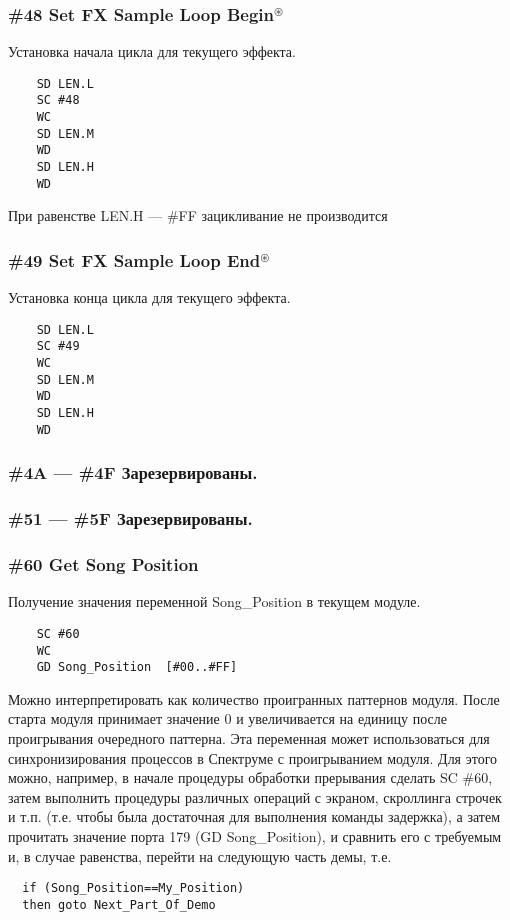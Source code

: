 \documentclass[a4paper,11pt]{article}
\DeclareRobustCommand{\Cyrax}{\texorpdfstring{\(^\circledast\)}{\circledast}}
\begin{document}
\subsubsection{\#48 Set FX Sample Loop Begin\Cyrax}
Установка начала цикла для текущего эффекта.
\begin{verbatim}
    SD LEN.L
    SC #48
    WC
    SD LEN.M
    WD
    SD LEN.H
    WD
\end{verbatim}

При равенстве LEN.H --- \#FF зацикливание не производится

\subsubsection{\#49 Set FX Sample Loop End\Cyrax\label{cmd:49}}
Установка конца цикла для текущего эффекта.
\begin{verbatim}
    SD LEN.L
    SC #49
    WC
    SD LEN.M
    WD
    SD LEN.H
    WD
\end{verbatim}

\subsubsection{\#4A --- \#4F Зарезервированы.}

\subsubsection{\#51 --- \#5F Зарезервированы.}

\subsubsection{\#60 Get Song Position}
Получение значения переменной Song\_Position в текущем модуле.
\begin{verbatim}
    SC #60
    WC
    GD Song_Position  [#00..#FF]
\end{verbatim}

Можно интерпретировать как количество проигранных паттернов модуля. После старта модуля принимает значение 0 и увеличивается на единицу после проигрывания очередного паттерна. Эта переменная может использоваться для синхронизирования процессов в Спектруме с проигрыванием модуля. Для этого можно, например, в начале процедуры обработки прерывания сделать SC  \#60, затем выполнить процедуры различных операций с экраном, скроллинга строчек и т.п. (т.е. чтобы была достаточная для выполнения команды задержка), а затем прочитать значение порта 179 (GD Song\_Position), и сравнить его с требуемым и, в случае равенства, перейти на следующую часть демы, т.е.
\begin{verbatim}
  if (Song_Position==My_Position)
  then goto Next_Part_Of_Demo
\end{verbatim}
\end{document}

